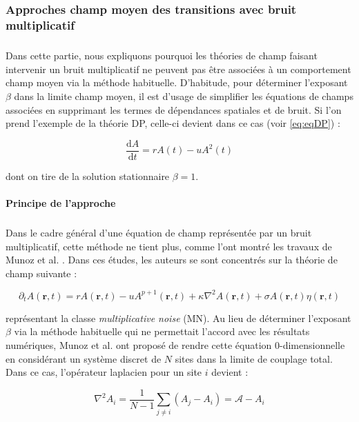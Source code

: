 \subsubsection{Approches champ moyen des transitions avec bruit multiplicatif}

\subparagraph{}Dans cette partie, nous expliquons pourquoi les théories de champ faisant intervenir un bruit multiplicatif ne peuvent pas être associées à un comportement champ moyen via la méthode habituelle. D'habitude, pour déterminer l'exposant $\beta$ dans la limite champ moyen, il est d'usage de simplifier les équations de champs associées en supprimant les termes de dépendances spatiales et de bruit. Si l'on prend l'exemple de la théorie DP, celle-ci devient dans ce cas (voir \autoref{eq:eqDP}) :

\begin{equation}
	\frac{\mathrm{d}A}{\mathrm{d}t} = rA(t) - u A^2(t)
\end{equation}

\noindent dont on tire de la solution stationnaire $\beta = 1$.

\paragraph{Principe de l'approche}

\subparagraph{}Dans le cadre général d'une équation de champ représentée par un bruit multiplicatif, cette méthode ne tient plus, comme l'ont montré les travaux de Munoz et al. \cite{munoz_multiplicative_2003, munoz_multiplicative_2003}. Dans ces études, les auteurs se sont concentrés sur la théorie de champ suivante :

\begin{equation}
	\partial_t A(\mathbf{r}, t) = rA(\mathbf{r}, t) - uA^{p+1}(\mathbf{r}, t) + \kappa\nabla^2 A (\mathbf{r}, t) + \sigma A(\mathbf{r}, t) \eta(\mathbf{r}, t)
	\label{eq:eqMN}
\end{equation}

\noindent représentant la classe \textit{multiplicative noise} (MN). Au lieu de déterminer l'exposant $\beta$ via la méthode habituelle qui ne permettait l'accord avec les résultats numériques, Munoz et al. ont proposé de rendre cette équation 0-dimensionnelle en considérant un système discret de $N$ sites dans la limite de couplage total. Dans ce cas, l'opérateur laplacien pour un site $i$ devient :

\begin{equation}
    \nabla^2 A_i = \frac{1}{N-1}\sum_{j\neq i}\left( A_j - A_i \right) = \mathcal{A} - A_i
\end{equation}

